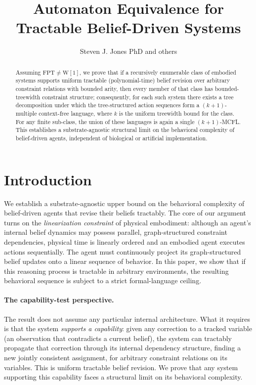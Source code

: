 \documentclass[11pt,a4paper]{article}
\title{Automaton Equivalence for Tractable Belief-Driven Systems}
\author{Steven J. Jones PhD and others}
\date{}
\theoremstyle{plain}
\theoremstyle{definition}
\theoremstyle{remark}
\begin{document}
\maketitle

\begin{abstract}
Assuming $\mathrm{FPT} \neq \mathrm{W}[1]$, we prove that if a recursively enumerable class of embodied systems supports uniform tractable (polynomial-time) belief revision over arbitrary constraint relations with bounded arity, then every member of that class has bounded-treewidth constraint structure; consequently, for each such system there exists a tree decomposition under which the tree-structured action sequences form a $(k{+}1)$-multiple context-free language, where $k$ is the uniform treewidth bound for the class.
For any finite sub-class, the union of these languages is again a single $(k{+}1)$-MCFL.
This establishes a substrate-agnostic structural limit on the behavioral complexity of belief-driven agents, independent of biological or artificial implementation.
\end{abstract}

\section{Introduction}\label{sec:intro}

We establish a substrate-agnostic upper bound on the behavioral complexity of belief-driven agents that revise their beliefs tractably.
The core of our argument turns on the \emph{linearization constraint} of physical embodiment: although an agent's internal belief dynamics may possess parallel, graph-structured constraint dependencies, physical time is linearly ordered and an embodied agent executes actions sequentially. The agent must continuously project its graph-structured belief updates onto a linear sequence of behavior. In this paper, we show that if this reasoning process is tractable in arbitrary environments, the resulting behavioral sequence is subject to a strict formal-language ceiling.

\paragraph{The capability-test perspective.}
The result does not assume any particular internal architecture.
What it requires is that the system \emph{supports a capability}: given any correction to a tracked variable (an observation that contradicts a current belief), the system can tractably propagate that correction through its internal dependency structure, finding a new jointly consistent assignment, for arbitrary constraint relations on its variables.
This is uniform tractable belief revision.
We prove that any system supporting this capability faces a structural limit on its behavioral complexity.
\end{document}
